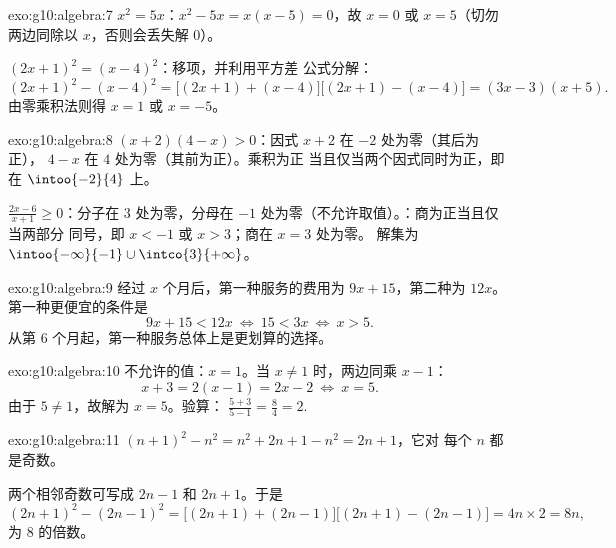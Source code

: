 \begin{solution}{exo:g10:algebra:7}
$x^2 = 5x$：$x^2 - 5x = x(x - 5) = 0$，故 $x = 0$ 或 $x = 5$（切勿
两边同除以 $x$，否则会丢失解 $0$）。

$(2x+1)^2 = (x-4)^2$：移项，并利用平方差
公式分解：
\[
(2x+1)^2 - (x-4)^2
= \bigl[(2x+1) + (x-4)\bigr]\bigl[(2x+1) - (x-4)\bigr]
= (3x - 3)(x + 5).
\]
由零乘积法则得 $x = 1$ 或 $x = -5$。
\end{solution}

\begin{solution}{exo:g10:algebra:8}
$(x+2)(4-x) > 0$：因式 $x + 2$ 在 $-2$ 处为零（其后为正），
$4 - x$ 在 $4$ 处为零（其前为正）。乘积为正
当且仅当两个因式同时为正，即在 $\intoo{-2}{4}$ 上。

$\frac{2x-6}{x+1} \geq 0$：分子在 $3$ 处为零，分母在
$-1$ 处为零（不允许取值）。：商为正当且仅当两部分
同号，即 $x < -1$ 或 $x > 3$；商在 $x = 3$ 处为零。
解集为 $\intoo{-\infty}{-1} \cup \intco{3}{+\infty}$。
\end{solution}

\begin{solution}{exo:g10:algebra:9}
经过 $x$ 个月后，第一种服务的费用为 $9x + 15$，第二种为 $12x$。
第一种更便宜的条件是
\[
9x + 15 < 12x
\ \Longleftrightarrow\
15 < 3x
\ \Longleftrightarrow\
x > 5 .
\]
从第 $6$ 个月起，第一种服务总体上是更划算的选择。
\end{solution}

\begin{solution}{exo:g10:algebra:10}
不允许的值：$x = 1$。当 $x \neq 1$ 时，两边同乘 $x - 1$：
\[
x + 3 = 2(x - 1) = 2x - 2
\ \Longleftrightarrow\
x = 5 .
\]
由于 $5 \neq 1$，故解为 $x = 5$。验算：
$\frac{5+3}{5-1} = \frac84 = 2$.
\end{solution}

\begin{solution}{exo:g10:algebra:11}
$(n+1)^2 - n^2 = n^2 + 2n + 1 - n^2 = 2n + 1$，它对
每个 $n$ 都是奇数。

两个相邻奇数可写成 $2n - 1$ 和 $2n + 1$。于是
\[
(2n+1)^2 - (2n-1)^2
= \bigl[(2n+1)+(2n-1)\bigr]\bigl[(2n+1)-(2n-1)\bigr]
= 4n \times 2 = 8n,
\]
为 $8$ 的倍数。
\end{solution}


